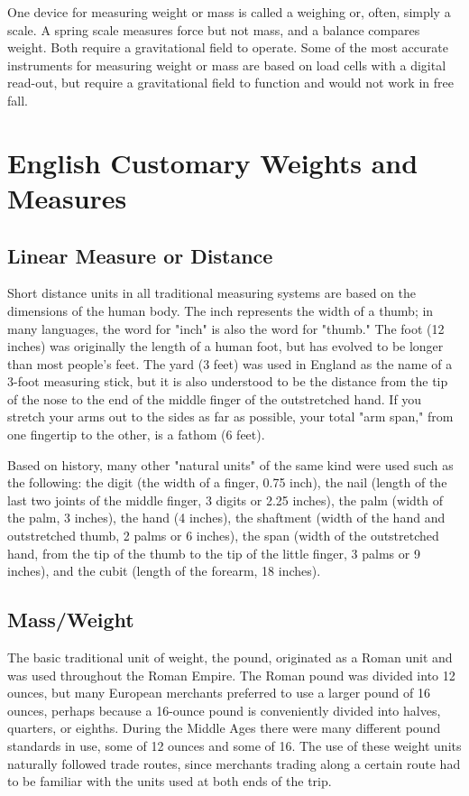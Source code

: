 One device for measuring weight or mass is called a weighing  or, often, simply
a scale. A spring scale measures force but not mass, and a balance compares weight. Both
require a gravitational field to operate. Some of the most accurate instruments for
measuring weight or mass are based on load cells with a digital read-out, but require a
gravitational field to function and would not work in free fall.

\section*{English Customary Weights and Measures}
\subsection*{Linear Measure or Distance}
Short distance units in all traditional measuring systems are based on the dimensions
of the human body. The inch represents the width of a thumb; in many languages, the word
for "inch" is also the word for "thumb." The foot (12 inches) was originally the length of a
human foot, but has evolved to be longer than most people's feet. The yard (3 feet) was
used in England as the name of a 3-foot measuring stick, but it is also understood to be the
distance from the tip of the nose to the end of the middle finger of the outstretched hand. If
you stretch your arms out to the sides as far as possible, your total "arm span," from one
fingertip to the other, is a fathom (6 feet).

Based on history, many other "natural units" of the same kind were used such as the
following: the digit (the width of a finger, 0.75 inch), the nail (length of the last two joints of
the middle finger, 3 digits or 2.25 inches), the palm (width of the palm, 3 inches), the hand
(4 inches), the shaftment (width of the hand and outstretched thumb, 2 palms or 6 inches),
the span (width of the outstretched hand, from the tip of the thumb to the tip of the little
finger, 3 palms or 9 inches), and the cubit (length of the forearm, 18 inches).

\subsection*{Mass/Weight}
The basic traditional unit of weight, the pound, originated as a Roman unit and was
used throughout the Roman Empire. The Roman pound was divided into 12 ounces, but
many European merchants preferred to use a larger pound of 16 ounces, perhaps because a
16-ounce pound is conveniently divided into halves, quarters, or eighths. During the Middle
Ages there were many different pound standards in use, some of 12 ounces and some of 16.
The use of these weight units naturally followed trade routes, since merchants trading along
a certain route had to be familiar with the units used at both ends of the trip.

